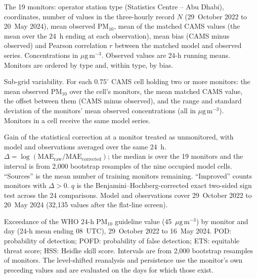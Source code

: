 \documentclass[preprint,review,12pt,authoryear]{elsarticle}
\newcommand*{\ugm}{\ensuremath{\mu\mathrm{g\,m^{-3}}}}
\newcommand*{\pmten}{\ensuremath{\mathrm{PM_{10}}}}
\begin{document}



\clearpage

\begin{table}[p]\centering\footnotesize
\caption{The 19 monitors: operator station type (Statistics Centre -- Abu Dhabi), coordinates, number of
values in the three-hourly record $N$ (29~October 2022 to 20~May 2024), mean observed \pmten{},
mean of the matched CAMS values (the mean over the 24~h ending at each observation), mean bias
(CAMS minus observed) and Pearson correlation $r$ between the matched model and observed series.
Concentrations in \ugm{}. Observed values are 24-h running means. Monitors are ordered by type
and, within type, by bias.}
\label{tab:stations}
\resizebox{\textwidth}{!}{}
\end{table}

\begin{table}[p]\centering\footnotesize
\caption{Sub-grid variability. For each $0.75^{\circ}$ CAMS cell holding two or more monitors:
the mean observed \pmten{} over the cell's monitors, the mean matched CAMS value, the offset
between them (CAMS minus observed), and the range and
standard deviation of the monitors' mean observed concentrations (all in \ugm{}). Monitors in a
cell receive the same model series.}
\label{tab:cells}
\resizebox{\textwidth}{!}{}
\end{table}

\begin{table}\centering\footnotesize
\caption{Gain of the statistical correction at a monitor treated as unmonitored, with model and
observations averaged over the same 24~h.
$\Delta=\log(\mathrm{MAE_{raw}}/\mathrm{MAE_{corrected}})$; the median is over the 19 monitors and
the interval is from 2,000 bootstrap resamples of the nine occupied model cells. ``Sources'' is
the mean number of training monitors remaining. ``Improved'' counts monitors with $\Delta>0$.
$q$ is the Benjamini--Hochberg-corrected exact two-sided sign test across the 24 comparisons.
Model and observations cover 29~October 2022 to 20~May 2024 (32,135 values after the flat-line
screen).}
\label{tab:transfer}
\resizebox{\textheight}{!}{}
\end{table}

\begin{table}[p]\centering\footnotesize
\caption{Exceedance of the WHO 24-h \pmten{} guideline value (45~\ugm{}) by monitor and day (24-h
mean ending 08~UTC), 29~October 2022 to 16~May 2024. POD: probability of detection; POFD: probability of
false detection; ETS: equitable threat score; HSS: Heidke skill score. Intervals are from 2,000
bootstrap resamples of monitors. The level-shifted reanalysis and persistence use the monitor's
own preceding values and are evaluated on the days for which those exist.}
\label{tab:exceed}
\resizebox{\textwidth}{!}{}
\end{table}
\end{document}
